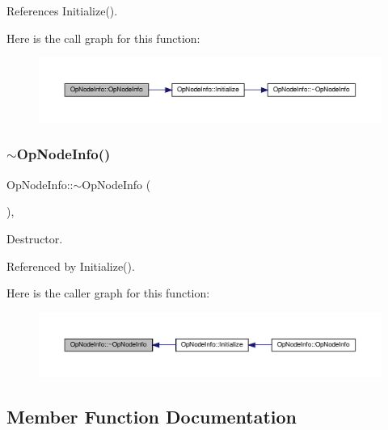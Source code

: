 References Initialize().

Here is the call graph for this function\+:
\nopagebreak
\begin{figure}[H]
\begin{center}
\leavevmode
\includegraphics[width=350pt]{da/d53/structOpNodeInfo_a756bde8314600d48ef576baea924d165_cgraph}
\end{center}
\end{figure}
\mbox{\label{structOpNodeInfo_ab13421a387f9fe59dd73a080d0cdb8de}} 
\subsubsection{\texorpdfstring{$\sim$\+Op\+Node\+Info()}{~OpNodeInfo()}}
{\footnotesize\ttfamily Op\+Node\+Info\+::$\sim$\+Op\+Node\+Info (\begin{DoxyParamCaption}{ }\end{DoxyParamCaption})\hspace{0.3cm}{\ttfamily [override]}, {\ttfamily [default]}}



Destructor. 



Referenced by Initialize().

Here is the caller graph for this function\+:
\nopagebreak
\begin{figure}[H]
\begin{center}
\leavevmode
\includegraphics[width=350pt]{da/d53/structOpNodeInfo_ab13421a387f9fe59dd73a080d0cdb8de_icgraph}
\end{center}
\end{figure}


\subsection{Member Function Documentation}
\mbox{\label{structOpNodeInfo_a5eb05c908fcd5a42b4ea921f21ac6393}} 
